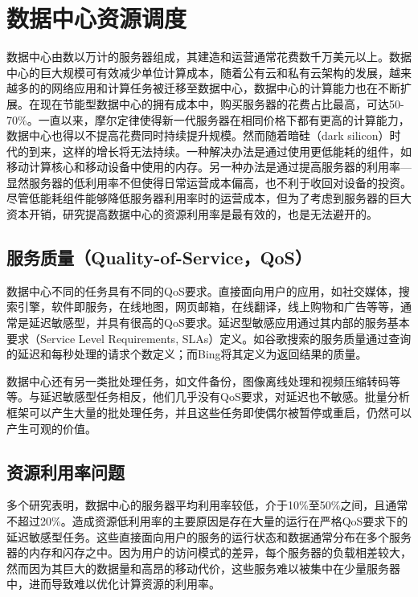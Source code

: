 
\chapter{数据中心资源调度}
数据中心由数以万计的服务器组成，其建造和运营通常花费数千万美元以上。数据中心的巨大规模可有效减少单位计算成本，随着公有云和私有云架构的发展，越来越多的的网络应用和计算任务被迁移至数据中心，数据中心的计算能力也在不断扩展。在现在节能型数据中心的拥有成本中，购买服务器的花费占比最高，可达50-70\%\cite{barroso2013datacenter}。一直以来，摩尔定律使得新一代服务器在相同价格下都有更高的计算能力，数据中心也得以不提高花费同时持续提升规模。然而随着暗硅（dark silicon）时代的到来\cite{esmaeilzadeh2011dark}\cite{hardavellas2011toward}，这样的增长将无法持续。一种解决办法是通过使用更低能耗的组件\cite{lo2014towards}，如移动计算核心\cite{janapa2010web}和移动设备中使用的内存\cite{malladi2012towards}。另一种办法是通过提高服务器的利用率---显然服务器的低利用率不但使得日常运营成本偏高，也不利于收回对设备的投资。尽管低能耗组件能够降低服务器利用率时的运营成本\cite{barroso2007case}，但为了考虑到服务器的巨大资本开销，研究提高数据中心的资源利用率是最有效的，也是无法避开的。

\section{服务质量（Quality-of-Service，QoS）}
数据中心不同的任务具有不同的QoS要求。直接面向用户的应用，如社交媒体，搜索引擎，软件即服务，在线地图，网页邮箱，在线翻译，线上购物和广告等等，通常是延迟敏感型，并具有很高的QoS要求。延迟型敏感应用通过其内部的服务基本要求（Service Level Requirements, SLAs）定义。如谷歌搜索的服务质量通过查询的延迟和每秒处理的请求个数定义；而Bing将其定义为返回结果的质量\cite{janapa2010web}\cite{kozyrakis2010server}。

数据中心还有另一类批处理任务，如文件备份，图像离线处理和视频压缩转码等等。与延迟敏感型任务相反，他们几乎没有QoS要求，对延迟也不敏感。批量分析框架可以产生大量的批处理任务，并且这些任务即使偶尔被暂停或重启，仍然可以产生可观的价值\cite{boutin2014apollo}\cite{carvalho2014long}\cite{curino2014reservation}\cite{delimitrou2014quasar}。

\section{资源利用率问题}
多个研究表明，数据中心的服务器平均利用率较低，介于10\%至50\%之间\cite{kaplan2008revolutionizing}\cite{vasan2010worth}\cite{reiss2012heterogeneity}\cite{barroso2013datacenter}\cite{delimitrou2014quasar}\cite{carvalho2014long}，且通常不超过20\%\cite{barroso2007case}。造成资源低利用率的主要原因是存在大量的运行在严格QoS要求下的延迟敏感型任务。这些直接面向用户的服务的运行状态和数据通常分布在多个服务器的内存和闪存之中。因为用户的访问模式的差异，每个服务器的负载相差较大，然而因为其巨大的数据量和高昂的移动代价，这些服务难以被集中在少量服务器中，进而导致难以优化计算资源的利用率。

